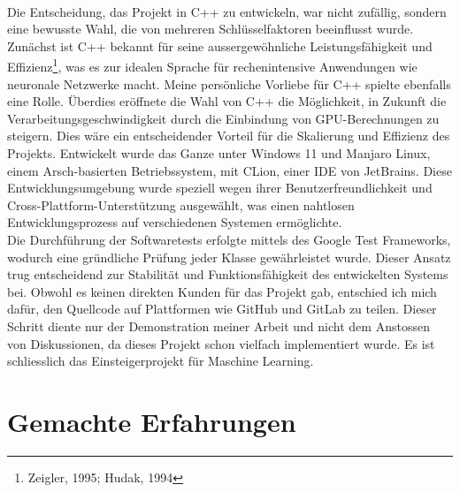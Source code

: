 \\
Die Entscheidung, das Projekt in C++ zu entwickeln, war nicht zufällig, sondern eine bewusste Wahl, die von mehreren Schlüsselfaktoren beeinflusst wurde. Zunächst ist C++ bekannt für seine aussergewöhnliche Leistungsfähigkeit und Effizienz\footnote{Zeigler, 1995; Hudak, 1994}, was es zur idealen Sprache für rechenintensive Anwendungen wie neuronale Netzwerke macht. Meine persönliche Vorliebe für C++ spielte ebenfalls eine Rolle. Überdies eröffnete die Wahl von C++ die Möglichkeit, in Zukunft die Verarbeitungsgeschwindigkeit durch die Einbindung von GPU-Berechnungen zu steigern. Dies wäre ein entscheidender Vorteil für die Skalierung und Effizienz des Projekts. Entwickelt wurde das Ganze unter Windows 11 und Manjaro Linux, einem Arsch-basierten Betriebssystem, mit CLion, einer IDE von JetBrains. Diese Entwicklungsumgebung wurde speziell wegen ihrer Benutzerfreundlichkeit und Cross-Plattform-Unterstützung ausgewählt, was einen nahtlosen Entwicklungsprozess auf verschiedenen Systemen ermöglichte. 
\\
Die Durchführung der Softwaretests erfolgte mittels des Google Test Frameworks, wodurch eine gründliche Prüfung jeder Klasse gewährleistet wurde. Dieser Ansatz trug entscheidend zur Stabilität und Funktionsfähigkeit des entwickelten Systems bei. Obwohl es keinen direkten Kunden für das Projekt gab, entschied ich mich dafür, den Quellcode auf Plattformen wie GitHub und GitLab zu teilen. Dieser Schritt diente nur der Demonstration meiner Arbeit und nicht dem Anstossen von Diskussionen, da dieses Projekt schon vielfach implementiert wurde. Es ist schliesslich das Einsteigerprojekt für Maschine Learning.

\section{Gemachte Erfahrungen}
